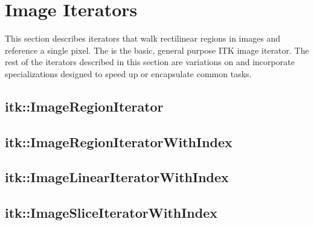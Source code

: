 




\section{Image Iterators}
\label{sec:ImageIterators}
This section describes iterators that walk rectilinear regions in images and
reference a single pixel.  The  is the basic,
general purpose ITK image iterator.  The rest of the
iterators described in this section are variations on
 and incorporate specializations designed to 
speed up or encapsulate common tasks.


\subsection{itk::ImageRegionIterator}
\label{sec:itkImageRegionIterator}


\subsection{itk::ImageRegionIteratorWithIndex}
\label{sec:itkImageRegionIteratorWithIndex}


\subsection{itk::ImageLinearIteratorWithIndex}
\label{sec:itkImageLinearIteratorWithIndex}


\subsection{itk::ImageSliceIteratorWithIndex}
\label{sec:itkImageSliceIteratorWithIndex}


